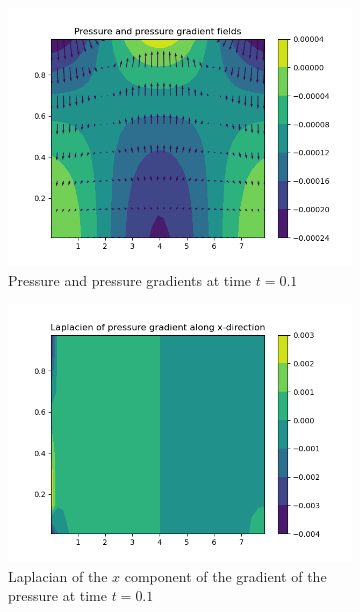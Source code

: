 \documentclass{article}
\begin{document}
\begin{figure}[ht]
  \centering
  \begin{subfigure}{0.32\textwidth}
    \centering
    \includegraphics[width=\textwidth]{images/pressure_data/pressure_pressuregradient.png}
    \caption{Pressure and pressure gradients at time $t=0.1$}
  \end{subfigure}\hfill
  \begin{subfigure}{0.32\textwidth}
    \centering
    \includegraphics[width=\textwidth]{images/pressure_data/laplacien_gradient_x.png}
    \caption{Laplacian of the $x$ component of the gradient of the pressure at time $t=0.1$}
  \end{subfigure}
  \hfill
  \begin{subfigure}{0.32\textwidth}

\end{subfigure}
\end{figure}
\end{document}
